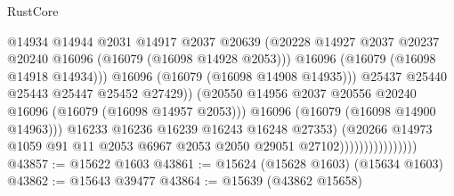 \begin{lexlean}{RustCore}
\begin{coremodule}
                                              @14934
                                              @14944
                                              @2031
                                              @14917
                                              @2037
                                              @20639
                                              (@20228
                                                @14927
                                                @2037
                                                @20237
                                                @20240
                                                @16096
                                                (@16079 (@16098 @14928 @2053)))
                                              @16096
                                              (@16079 (@16098 @14918 @14934)))
                                            @16096
                                            (@16079 (@16098 @14908 @14935)))
                                          @25437
                                          @25440
                                          @25443
                                          @25447
                                          @25452
                                          @27429))
                                      (@20550
                                        @14956
                                        @2037
                                        @20556
                                        @20240
                                        @16096
                                        (@16079 (@16098 @14957 @2053)))
                                      @16096
                                      (@16079 (@16098 @14900 @14963)))
                                    @16233
                                    @16236
                                    @16239
                                    @16243
                                    @16248
                                    @27353)
                                  (@20266
                                    @14973
                                    @1059
                                    @91
                                    @11
                                    @2053
                                    @6967
                                    @2053
                                    @2050
                                    @29051
                                    @27102))))))))))))))))
@43857 := @15622 @1603
@43861 := @15624 (@15628 @1603) (@15634 @1603)
@43862 := @15643 @39477
@43864 := @15639 (@43862 @15658)

\end{coremodule}
\end{lexlean}
